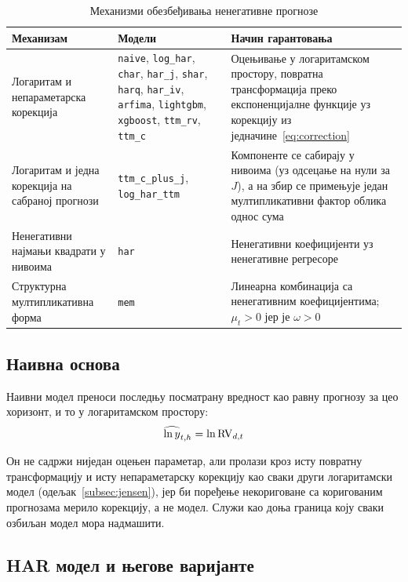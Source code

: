 \begin{table}[htbp]
\centering
\caption{Механизми обезбеђивања ненегативне прогнозе}
\label{tab:pozitivnost}
\begin{tabularx}{\textwidth}{L{3.4cm} L{4.6cm} X}
\toprule
Механизам & Модели & Начин гарантовања \\
\midrule
Логаритам и непараметарска корекција &
\texttt{naive}, \texttt{log\_har}, \texttt{char}, \texttt{har\_j}, \texttt{shar},
\texttt{harq}, \texttt{har\_iv}, \texttt{arfima}, \texttt{lightgbm},
\texttt{xgboost}, \texttt{ttm\_rv}, \texttt{ttm\_c} &
Оцењивање у логаритамском простору, повратна трансформација преко експоненцијалне
функције уз корекцију из једначине~\eqref{eq:correction} \\
\addlinespace
Логаритам и једна корекција на сабраној прогнози &
\texttt{ttm\_c\_plus\_j}, \texttt{log\_har\_ttm} &
Компоненте се сабирају у нивоима (уз одсецање на нули за $J$), а на збир се примењује
један мултипликативни фактор облика однос сума \\
\addlinespace
Ненегативни најмањи квадрати у нивоима &
\texttt{har} &
Ненегативни коефицијенти уз ненегативне регресоре \\
\addlinespace
Структурна мултипликативна форма &
\texttt{mem} &
Линеарна комбинација са ненегативним коефицијентима; $\mu_t > 0$ јер је $\omega > 0$ \\
\bottomrule
\end{tabularx}
\end{table}

\subsection{Наивна основа}

Наивни модел преноси последњу посматрану вредност као равну прогнозу за цео хоризонт,
и то у логаритамском простору:
\begin{equation}
\widehat{\ln y}_{t,h} = \ln\mathrm{RV}_{d,t}
\end{equation}

Он не садржи ниједан оцењен параметар, али пролази кроз исту повратну трансформацију
и исту непараметарску корекцију као сваки други логаритамски модел
(одељак~\ref{subsec:jensen}), јер би поређење некориговане са коригованим прогнозама
мерило корекцију, а не модел. Служи као доња граница коју сваки озбиљан модел мора
надмашити.

\subsection{HAR модел и његове варијанте}
\label{subsec:har}

